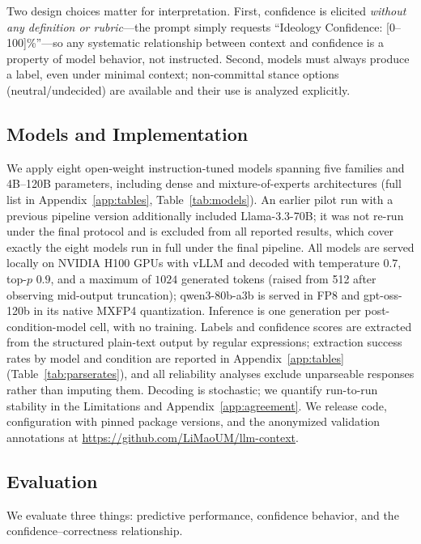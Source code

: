 \documentclass[11pt]{article}
\begin{document}
Two design choices matter for interpretation. First, confidence is elicited \emph{without any definition or rubric}---the prompt simply requests ``Ideology Confidence: [0--100]\%''---so any systematic relationship between context and confidence is a property of model behavior, not instructed. Second, models must always produce a label, even under minimal context; non-committal stance options (neutral/undecided) are available and their use is analyzed explicitly.

\subsection{Models and Implementation}
\label{sec:models}

We apply eight open-weight instruction-tuned models spanning five families and 4B--120B parameters, including dense and mixture-of-experts architectures (full list in Appendix~\ref{app:tables}, Table~\ref{tab:models}). An earlier pilot run with a previous pipeline version additionally included Llama-3.3-70B; it was not re-run under the final protocol and is excluded from all reported results, which cover exactly the eight models run in full under the final pipeline. All models are served locally on NVIDIA H100 GPUs with vLLM \cite{kwon2023vllm} and decoded with temperature $0.7$, top-$p$ $0.9$, and a maximum of $1024$ generated tokens (raised from 512 after observing mid-output truncation); qwen3-80b-a3b is served in FP8 and gpt-oss-120b in its native MXFP4 quantization. Inference is one generation per post-condition-model cell, with no training. Labels and confidence scores are extracted from the structured plain-text output by regular expressions; extraction success rates by model and condition are reported in Appendix~\ref{app:tables} (Table~\ref{tab:parserates}), and all reliability analyses exclude unparseable responses rather than imputing them. Decoding is stochastic; we quantify run-to-run stability in the Limitations and Appendix~\ref{app:agreement}. We release code, configuration with pinned package versions, and the anonymized validation annotations at \url{https://github.com/LiMaoUM/llm-context}.

\subsection{Evaluation}
\label{sec:evaluation_metrics}

We evaluate three things: predictive performance, confidence behavior, and the confidence--correctness relationship.
\end{document}
